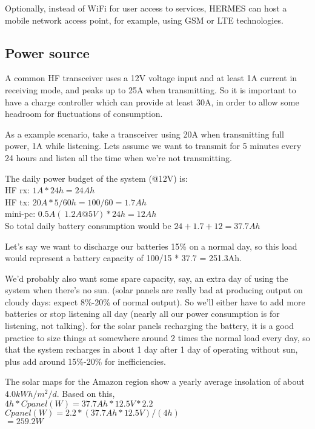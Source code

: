 \documentclass[11pt,a4paper]{article}
\begin{document}
Optionally, instead of WiFi for user access to services, HERMES can host
a mobile network access point, for example, using GSM or LTE technologies.

\subsection{Power source}

A common HF transceiver uses a 12V voltage input and at least 1A current in
receiving mode, and peaks up to 25A when transmitting. So it is important
to have a charge controller which can provide at least 30A, in order to
allow some headroom for fluctuations of consumption.

As a example scenario, take a transceiver using 20A when transmitting full
power, 1A while listening. Lets assume we want to transmit for 5 minutes
every 24 hours and listen all the time when we're not transmitting.

The daily power budget of the system (@12V) is:\\
HF rx: $1A * 24h = 24Ah$ \\
HF tx: $20A * 5/60h = 100/60 = 1.7Ah$\\
mini-pc: $0.5A (~ 1.2A@5V) * 24h = 12Ah$\\

So total daily battery consumption would be $24+1.7+12 = 37.7Ah$

Let's say we want to discharge our batteries 15\% on a normal day, so
this load would represent a battery capacity of 100/15 * 37.7 = 251.3Ah.

We'd probably also want some spare capacity, say, an extra day of using the 
system when there's no sun. (solar panels are really bad at producing output
on cloudy days: expect 8\%-20\% of normal output). So we'll either have to
add more batteries or stop listening all day (nearly all our power
consumption is for listening, not talking). for the solar panels recharging
the battery, it is a good practice to size things at somewhere around 2
times the normal load every day, so that the system recharges in about 1 day
after 1 day of operating without sun, plus add around 15\%-20\% for
inefficiencies.

The solar maps for the Amazon region show a yearly average insolation
of about $4.0 kWh/m^2/d$. Based on this,\\
$4h * Cpanel(W) = 37.7Ah*12.5V*2.2$\\
$Cpanel(W) = 2.2*(37.7Ah*12.5V)/(4h)$\\
$= 259.2W$
\end{document}
